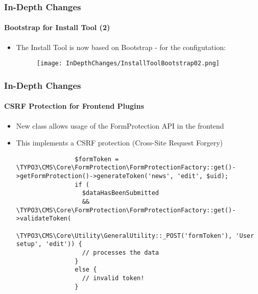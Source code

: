 
\begin{frame}[fragile]
	\frametitle{In-Depth Changes}
	\framesubtitle{Bootstrap for Install Tool (2)}

	\begin{itemize}

		\item The Install Tool is now based on Bootstrap - for the configutation:

			\begin{figure}
				\texttt{[image: InDepthChanges/InstallToolBootstrap02.png]}
			\end{figure}

	\end{itemize}

\end{frame}


\begin{frame}[fragile]
	\frametitle{In-Depth Changes}
	\framesubtitle{CSRF Protection for Frontend Plugins}

	\lstset{basicstyle=\tiny\ttfamily}

	\begin{itemize}

		\item New class allows usage of the FormProtection API in the frontend

		\item This implements a CSRF protection (Cross-Site Request Forgery)

			\begin{lstlisting}
				$formToken = \TYPO3\CMS\Core\FormProtection\FormProtectionFactory::get()->getFormProtection()->generateToken('news', 'edit', $uid);
				if (
				  $dataHasBeenSubmitted
				  && \TYPO3\CMS\Core\FormProtection\FormProtectionFactory::get()->validateToken(
				    \TYPO3\CMS\Core\Utility\GeneralUtility::_POST('formToken'), 'User setup', 'edit')) {
				  // processes the data
				}
				else {
				  // invalid token!
				}
			\end{lstlisting}

	\end{itemize}

\end{frame}

